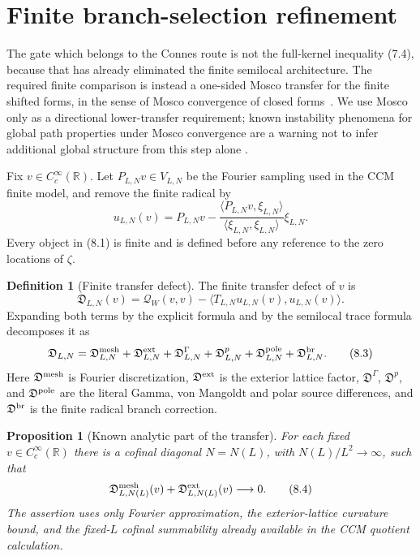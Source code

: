 \documentclass[11pt]{amsart}
\newtheorem{proposition}[theorem]{Proposition}
\theoremstyle{definition}
\newtheorem{definition}[theorem]{Definition}
\theoremstyle{remark}
\newcommand{\R}{\mathbb R}
\newcommand{\QW}{\mathcal Q_W}
\begin{document}
\section{Finite branch-selection refinement}

The gate which belongs to the Connes route is not the full-kernel
inequality (7.4), because that has already eliminated the finite
semilocal architecture.  The required finite comparison is instead a
one-sided Mosco
transfer for the finite shifted forms, in the sense of Mosco convergence
of closed forms~\cite{Mosco1969,KuwaeShioya2003,Post2012}.  We use Mosco
only as a directional lower-transfer requirement; known instability
phenomena for global path properties under Mosco convergence are a
warning not to infer additional global structure from this step alone
\cite{SuzukiUemura2014}.

Fix \(v\in C_c^\infty(\R)\).  Let \(P_{L,N}v\in V_{L,N}\) be the Fourier
sampling used in the CCM finite model, and remove the finite radical by
\[
 u_{L,N}(v)
 =
 P_{L,N}v-
 \frac{\langle P_{L,N}v,\xi_{L,N}\rangle}
      {\langle \xi_{L,N},\xi_{L,N}\rangle}\xi_{L,N}.
\tag{8.1}
\]
Every object in (8.1) is finite and is defined before any reference to
the zero locations of \(\zeta\).

\begin{definition}[Finite transfer defect]
The finite transfer defect of \(v\) is
\[
 \mathfrak D_{L,N}(v)
 =
 \QW(v,v)-
 \langle T_{L,N}u_{L,N}(v),u_{L,N}(v)\rangle .
\tag{8.2}
\]
Expanding both terms by the explicit formula and by the semilocal trace
formula decomposes it as
\[
 \mathfrak D_{L,N}
 =
 \mathfrak D^{\rm mesh}_{L,N}
 +\mathfrak D^{\rm ext}_{L,N}
 +\mathfrak D^{\Gamma}_{L,N}
 +\mathfrak D^{p}_{L,N}
 +\mathfrak D^{\rm pole}_{L,N}
 +\mathfrak D^{\rm br}_{L,N}.
\tag{8.3}
\]
Here \(\mathfrak D^{\rm mesh}\) is Fourier discretization, 
\(\mathfrak D^{\rm ext}\) is the exterior lattice factor,
\(\mathfrak D^{\Gamma}\), \(\mathfrak D^p\), and
\(\mathfrak D^{\rm pole}\) are the literal Gamma, von Mangoldt and polar
source differences, and \(\mathfrak D^{\rm br}\) is the finite radical
branch correction.
\end{definition}

\begin{proposition}[Known analytic part of the transfer]
\label{prop:known-transfer}
For each fixed \(v\in C_c^\infty(\R)\) there is a cofinal diagonal
\(N=N(L)\), with \(N(L)/L^2\to\infty\), such that
\[
 \mathfrak D^{\rm mesh}_{L,N(L)}(v)
 +\mathfrak D^{\rm ext}_{L,N(L)}(v)
 \longrightarrow0 .
\tag{8.4}
\]
The assertion uses only Fourier approximation, the exterior-lattice
curvature bound, and the fixed-\(L\) cofinal summability already available
in the CCM quotient calculation.
\end{proposition}
\end{document}
